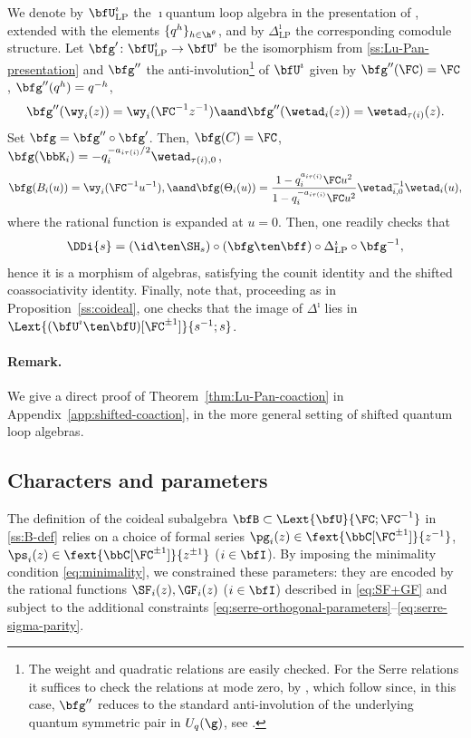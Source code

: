 \documentclass[reqno]{amsart}
\numberwithin{equation}{section}
\newenvironment{remark}{\medskip\paragraph{{\bf Remark.}}}{\par\medskip}
\begin{document}
We denote by $\bfU^\imath_{\operatorname{LP}}$ the $\imath$quantum  loop algebra in the presentation of \cite{lu-pan-26}, extended with the elements $\{q^h\}_{h\in\h^{\theta}}$, and by $\Delta^\imath_{\operatorname{LP}}$ the corresponding comodule structure. Let $\bfg'\colon\bfU^\imath_{\operatorname{LP}}\to\bfU^\imath$ be the isomorphism from \ref{ss:Lu-Pan-presentation} and $\bfg''$ the anti-involution\footnote{
The weight and quadratic relations are easily checked. For the Serre relations it suffices to check the relations at mode zero, by \cite[Sec.~4.3]{lu-pan-26}, which follow since, in this case, $\bfg''$ reduces to the standard anti-involution of the underlying quantum symmetric pair in $U_q(\g)$, see \cite[Lem.~2.6(1)]{lu-pan-26}.
} of $\bfU^\imath$ given by
$ \bfg''(\FC)=\FC$, $\bfg''(q^h)=q^{-h}$, 
\begin{equation}\label{eq:iota-spectral-reflection}
\bfg''(\wy_i(z))=\wy_i(\FC^{-1}z^{-1})
\aand
\bfg''(\wetad_i(z))=\wetad_{\tau(i)}(z).
\end{equation}
Set $\bfg=\bfg''\circ\bfg'$. Then, $\bfg(C)=\FC$, 
$\bfg(\bbK_i)=-q_i^{-a_{i\tau(i)}/2}\wetad_{\tau(i),0}$,
\begin{equation}\label{eq:LP-coaction-dictionary}
\bfg(B_i(u))=\wy_i(\FC^{-1}u^{-1}),
\aand
\bfg(\Theta_i(u))=
\frac{1-q_i^{a_{i\tau(i)}}\FC u^2}{1-q_i^{-a_{i\tau(i)}}\FC u^2}
\wetad_{i,0}^{-1}\wetad_i(u),
\end{equation}
where the rational function is expanded at $u=0$. Then, one readily checks that
\begin{equation}\label{eq:LP-coaction-transport}
\DDi{s}=(\id\ten\SH_s)\circ (\bfg\ten\bff)\circ
\Delta^\imath_{\mathrm{LP}}\circ\bfg^{-1},
\end{equation}
hence it is a morphism of algebras, satisfying the counit identity and the shifted coassociativity identity. Finally, note that, proceeding as in Proposition~\ref{ss:coideal},
one checks that the image of $\Delta^\imath$ lies in $\Lext{(\bfU^\imath\ten\bfU)[\FC^{\pm1}]}{s^{-1};s}$.


\begin{remark}
We give a direct proof of Theorem~\ref{thm:Lu-Pan-coaction} in
Appendix~\ref{app:shifted-coaction}, in the more general setting of
shifted quantum loop algebras.\hfill\rmkend
\end{remark}

\subsection{Characters and parameters}
\label{ss:characters-admissible-parameters}
The definition of the coideal subalgebra $\bfB\subset\Lext{\bfU}{\FC;\FC^{-1}}$
in \ref{ss:B-def} relies on a choice of formal series $\pg_{i}(z)\in\fext{\bbC[\FC^{\pm1}]}{z^{-1}}$, 
$\ps_i(z)\in\fext{\bbC[\FC^{\pm1}]}{z^{\pm1}}$ ($i\in\bfI$).
By imposing the minimality condition \eqref{eq:minimality}, we constrained
these parameters: they are encoded by the rational functions $\SF_i(z), \GF_i(z)$ ($i\in\bfI$) described in \eqref{eq:SF+GF} and subject to the additional constraints \eqref{eq:serre-orthogonal-parameters}--\eqref{eq:serre-sigma-parity}.\\
\end{document}

